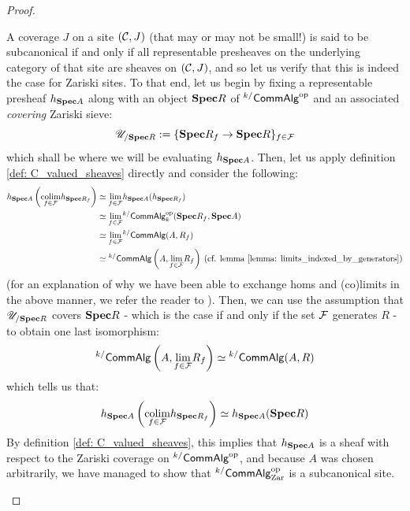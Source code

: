 \begin{proof}
\begin{enumerate}
                                A coverage $J$ on a site $(\mathcal{C}, J)$ (that may or may not be small!) is said to be subcanonical if and only if all representable presheaves on the underlying category of that site are sheaves on $(\mathcal{C}, J)$, and so let us verify that this is indeed the case for Zariski sites. To that end, let us begin by fixing a representable presheaf $h_{\mathbf{Spec} A}$ along with an object $\mathbf{Spec} R$ of ${}^{k/}\mathsf{Comm}\mathsf{Alg}^{\mathrm{op}}$ and an associated \textit{covering} Zariski sieve:
                                    $$\mathscr{U}_{/\mathbf{Spec} R} := \{\mathbf{Spec} R_f \to \mathbf{Spec} R\}_{f \in \mathcal{F}}$$
                                which shall be where we will be evaluating $h_{\mathbf{Spec} A}$. Then, let us apply definition \ref{def: C_valued_sheaves} directly and consider the following:
                                    $$
                                        \begin{aligned}
                                            h_{\mathbf{Spec} A}\left(\underset{f \in \mathcal{F}}{\operatorname{colim}} h_{\mathbf{Spec} R_f}\right) & \simeq \underset{f \in \mathcal{F}}{\operatorname{lim}} h_{\mathbf{Spec} A}(h_{\mathbf{Spec} R_f})
                                            \\
                                            & \simeq \underset{f \in \mathcal{F}}{\operatorname{lim}} {}^{k/}\mathsf{Comm}\mathsf{Alg}_k^{\mathrm{op}}(\mathbf{Spec} R_f, \mathbf{Spec} A)
                                            \\
                                            & \simeq \underset{f \in \mathcal{F}}{\operatorname{lim}} {}^{k/}\mathsf{Comm}\mathsf{Alg}(A, R_f)
                                            \\
                                            & \simeq {}^{k/}\mathsf{Comm}\mathsf{Alg}\left(A, \underset{f \in \mathcal{F}}{\operatorname{lim}} R_f\right) \: \text{(cf. lemma \ref{lemma: limits_indexed_by_generators})}
                                        \end{aligned}
                                    $$
                                (for an explanation of why we have been able to exchange homs and (co)limits in the above manner, we refer the reader to \cite{nlab:hom-functor_preserves_limits}). Then, we can use the assumption that $\mathscr{U}_{/\mathbf{Spec} R}$ covers $\mathbf{Spec} R$ - which is the case if and only if the set $\mathcal{F}$ generates $R$ - to obtain one last isomorphism:
                                    $${}^{k/}\mathsf{Comm}\mathsf{Alg}\left(A, \underset{f \in \mathcal{F}}{\operatorname{lim}} R_f\right) \simeq {}^{k/}\mathsf{Comm}\mathsf{Alg}(A, R)$$
                                which tells us that:
                                    $$h_{\mathbf{Spec} A}\left(\underset{f \in \mathcal{F}}{\operatorname{colim}} h_{\mathbf{Spec} R_f}\right) \simeq h_{\mathbf{Spec} A}(\mathbf{Spec} R)$$
                                By definition \ref{def: C_valued_sheaves}, this implies that $h_{\mathbf{Spec} A}$ is a sheaf with respect to the Zariski coverage on ${}^{k/}\mathsf{Comm}\mathsf{Alg}^{\mathrm{op}}$, and because $A$ was chosen arbitrarily, we have managed to show that ${}^{k/}\mathsf{Comm}\mathsf{Alg}^{\mathrm{op}}_{\mathrm{Zar}}$ is a subcanonical site. 
                            \end{enumerate}
                        \end{proof}
                        
